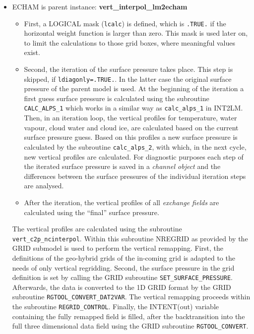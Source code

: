 \documentclass[11pt,twoside]{article}
\begin{document}
\begin{itemize}
\item ECHAM is parent instance: {\bf vert\_interpol\_lm2echam}
\begin{itemize}
\item First,  a {\footnotesize LOGICAL }mask (\verb|lcalc|) is defined, which is \verb|.TRUE.|
if the horizontal weight function is larger than zero. This mask is used
later on, to limit the calculations to those grid boxes, where
meaningful values exist.
\item Second, the iteration of the surface pressure takes place. This step
is skipped, if \verb|ldiagonly=.TRUE.|. In the latter case the
original surface pressure of the parent model is used.
At the beginning of the iteration a first guess surface pressure is
calculated using the subroutine \verb|CALC_ALPS_1| which works in a
similar way as \verb|calc_alps_1| in INT2LM. 
Then, in an iteration loop, the vertical profiles for temperature, water
vapour, cloud water and cloud ice, are calculated based on the current
surface pressure guess. Based on this profiles a new surface pressure
is calculated by the subroutine \verb|calc_alps_2|, 
with which, in the next cycle, new vertical profiles are
calculated. For diagnostic purposes each step of the iterated surface
pressure is saved in a {\it channel object} and the differences between
the surface pressures of the individual iteration steps are analysed.
\item After the iteration, the vertical profiles of all {\it exchange fields}
are calculated using  the ``final'' surface pressure.
\end{itemize}
The vertical profiles are calculated using the
subroutine \verb|vert_c2p_ncinterpol|. Within this subroutine NREGRID
as provided by the GRID submodel is used to perform the vertical
remapping.
First, the definitions of the geo-hybrid grids of the in-coming grid
is adapted to the needs of only vertical regridding. Second,
the surface pressure in the grid definition is set by calling the
GRID subroutine \verb|SET_SURFACE_PRESSURE|. Afterwards, the data is
converted to the 1D GRID format by the GRID subroutine 
\verb|RGTOOL_CONVERT_DAT2VAR|. The vertical remapping proceeds within
the subroutine \verb|REGRID_CONTROL|. Finally, the INTENT(out)
variable containing the fully remapped field is filled, after the
backtransition into the full three dimensional data field using the
GRID subroutine \verb|RGTOOL_CONVERT|.


\end{itemize}
\end{document}
